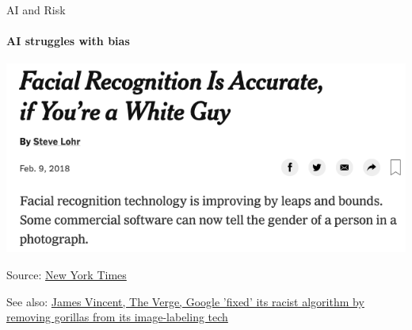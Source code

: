 \begin{frame}{AI and Risk}
  \framesubtitle{AI struggles with bias}
  \includegraphics[height=0.6\textheight]{graphics/facial_bias}

  Source: \href{https://www.nytimes.com/2018/02/09/technology/facial-recognition-race-artificial-intelligence.html}{New York Times}

  See also: \href{https://www.theverge.com/2018/1/12/16882408/google-racist-gorillas-photo-recognition-algorithm-ai}{James Vincent, The Verge, Google 'fixed' its racist algorithm by removing gorillas from its image-labeling tech}
\end{frame}


